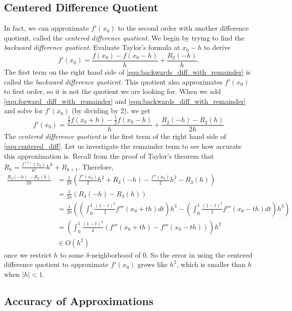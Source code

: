 \subsection*{Centered Difference Quotient} %

In fact, we can approximate $f'(x_0)$ to the second order with another difference quotient, called the \emph{centered difference quotient}.  We begin by trying to find the \emph{backward difference quotient}.
Evaluate Taylor's formula at $x_0-h$ to derive
%
\begin{equation}\label{equ:backwards_diff_with_remainder}
f'(x_0) = \frac{f(x_0)-f(x_0-h)}{h} + \frac{R_2(-h)}{h}.
\end{equation}
%
The first term on the right hand side of \eqref{equ:backwards_diff_with_remainder} is called the \emph{backward difference quotient.}
This quotient also approximates $f'(x_0)$ to first order, so it is not the quotient we are looking for.
When we add \eqref{equ:forward_diff_with_remainder} and \eqref{equ:backwards_diff_with_remainder} and solve for $f'(x_0)$ (by dividing by 2), we get
%
\begin{equation}\label{equ:centered_diff}
f'(x_0) = \frac{\frac{1}{2}f(x_0+h) - \frac{1}{2}f(x_0-h)}{h} + \frac{R_2(-h) - R_2(h)}{2h}
\end{equation}
%
The \emph{centered difference quotient} is the first term of the right hand side of \eqref{equ:centered_diff}.
Let us investigate the remainder term to see how accurate this approximation is.
Recall from the proof of Taylor's theorem that $R_k = \frac{f^{(k)}(x_0)}{k!}h^k + R_{k+1}$. Therefore,
%
\begin{align*}
\frac{R_2(-h) - R_2(h)}{2h} &= \frac{1}{2h}\left(\frac{f''(x_0)}{2}h^2 + R_{3}(-h) - \frac{f''(x_0)}{2}h^2 - R_{3}(h) \right)\\
&= \frac{1}{2h} ( R_3(-h)-R_3(h))\\
&= \frac{1}{2h}\left(  \left( \int_0^1 \frac{(1-t)^2}{2} f'''(x_0+th) dt \right) h^3  -  \left(\int_0^1 \frac{(1-t)^2}{2} f'''(x_0-th) dt \right) h^3  \right)\\
&= \left(  \int_0^1 \frac{(1-t)^2}{4}( f'''(x_0+th)-f'''(x_0-th)) \right)h^2\\
&{\in}   O(h^2)
\end{align*}
%
once we restrict $h$ to some $\delta$-neighborhood of 0.
So the error in using the centered difference quotient to approximate $f'(x_0)$ grows like $h^2$, which is smaller than $h$ when $|h|<1$.

\subsection*{Accuracy of Approximations} %

